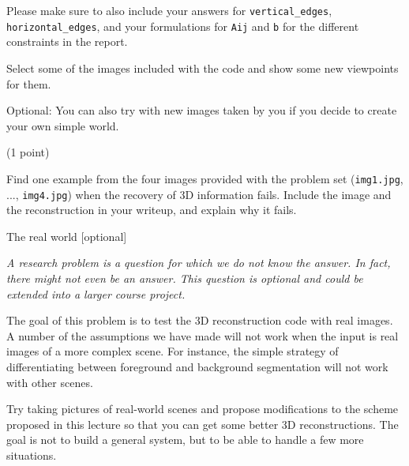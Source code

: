 Please make sure to also include your answers for \texttt{vertical\_edges}, \texttt{horizontal\_edges}, and your formulations for \texttt{Aij} and \texttt{b} for the different constraints in the report.


Select some of the images included with the code and show some new viewpoints for them.

Optional: You can also try with new images taken by you if you decide to create your own simple world.

 (1 point)

Find one example from the four images provided with the problem set (\texttt{img1.jpg}, ..., \texttt{img4.jpg}) when the recovery of 3D information fails. Include the image and the reconstruction in your writeup, and explain why it fails.

 {The real world} [optional]

\textit{A research problem is a question for which we do not know the answer. In fact, there might not
even be an answer. This question is optional and could be extended into a larger course project.}

The goal of this problem is to test the 3D reconstruction code with real images. A number of the assumptions we have made will not work when the input is real images of a more complex scene. For instance, the simple strategy of differentiating between foreground and background segmentation will not work with other scenes.

Try taking pictures of real-world scenes and propose modifications to the scheme proposed in this lecture so that you can get some better 3D reconstructions. The goal is not to build a general system, but to be able to handle a few more situations.

